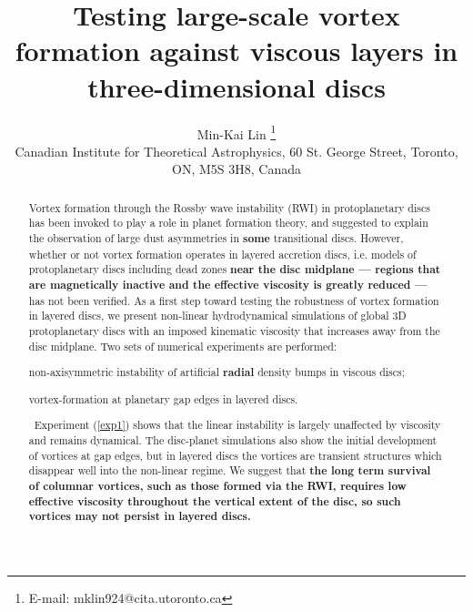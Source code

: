 \documentclass[useAMS,usenatbib]{mn2e}
\title[Vortices in viscous discs]{Testing large-scale 
  vortex formation against viscous layers in three-dimensional discs}
\author[Lin]{Min-Kai Lin%
  \thanks{E-mail: mklin924@cita.utoronto.ca} \\%
Canadian Institute for Theoretical Astrophysics,
  60 St. George Street, Toronto, ON, M5S 3H8, Canada %
}
\begin{document}
\maketitle
\begin{abstract}
  Vortex formation through the Rossby wave 
  instability (RWI) in protoplanetary discs has been invoked to play a
  role in planet formation theory, and suggested to explain
  the observation of large dust asymmetries in {\bf some} transitional discs.   
  However, whether or not vortex formation operates in layered
  accretion discs, i.e. models of protoplanetary discs including dead
  zones {\bf near the disc midplane --- regions that are magnetically
    inactive and the effective viscosity is greatly reduced ---}   
  has not been verified. As a first step toward testing the robustness of
  vortex formation in layered discs, we present 
  non-linear hydrodynamical 
  simulations of global 3D protoplanetary discs with an imposed kinematic
  viscosity that increases away from the disc midplane. Two sets of numerical 
  experiments are performed:
  \begin{inparaenum}[(i)]
  \item non-axisymmetric instability of artificial
    {\bf radial} density bumps in viscous discs;\label{exp1}  
  \item vortex-formation at planetary gap edges in layered discs.%
  \end{inparaenum}\,
   Experiment (\ref{exp1}) shows that the linear instability is
   largely unaffected by viscosity and remains dynamical.   
   The disc-planet simulations  
   also show the initial development of vortices at gap edges, but in
   layered discs the vortices are transient structures which disappear  
    well into the non-linear regime. We suggest that {\bf the long term survival of 
     columnar vortices, such as those formed via the RWI, 
     requires low effective viscosity throughout the vertical extent
     of the disc, so such vortices may not persist in layered discs.  
   }
%
\end{abstract}
\end{document}
